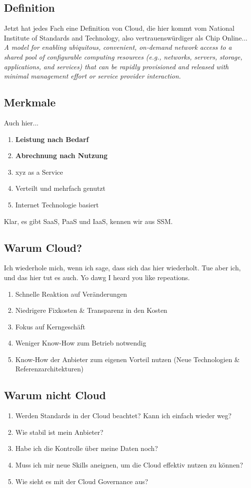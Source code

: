 \subsection{Definition}
Jetzt hat jedes Fach eine Definition von Cloud, die hier kommt vom National Institute of Standards and Technology, also  vertrauenswürdiger als Chip Online...
\textit{A model for enabling ubiquitous, convenient, on‐demand network access to a shared pool of configurable computing resources (e.g., networks, servers, storage, applications, and services) that can be rapidly provisioned and released with minimal management effort or service provider interaction.}
\subsection{Merkmale}
Auch hier...
\begin{enumerate}
	\item \textbf{Leistung nach Bedarf}
	\item \textbf{Abrechnung nach Nutzung}
	\item xyz as a Service
	\item Verteilt und mehrfach genutzt
	\item Internet Technologie basiert
\end{enumerate}
Klar, es gibt SaaS, PaaS und IaaS, kennen wir aus SSM.
\subsection{Warum Cloud?}
Ich wiederhole mich, wenn ich sage, dass sich das hier wiederholt. Tue aber ich, und das hier tut es auch. Yo dawg I heard you like repeations.
\begin{enumerate}
	\item Schnelle Reaktion auf Veränderungen
	\item Niedrigere Fixkosten \& Transparenz in den Kosten
	\item Fokus auf Kerngeschäft
	\item Weniger Know-How zum Betrieb notwendig
	\item Know-How der Anbieter zum eigenen Vorteil nutzen (Neue Technologien \& Referenzarchitekturen)
\end{enumerate}
\subsection{Warum nicht Cloud}
\begin{enumerate}
	\item Werden Standards in der Cloud beachtet? Kann ich einfach wieder weg?
	\item Wie stabil ist mein Anbieter?
	\item Habe ich die Kontrolle über meine Daten noch?
	\item Muss ich mir neue Skills aneignen, um die Cloud effektiv nutzen zu können?
	\item Wie sieht es mit der Cloud Governance aus?
\end{enumerate}
